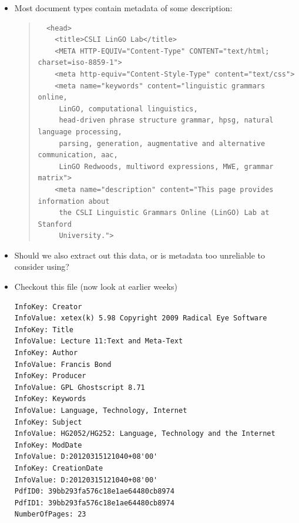 \documentclass[a4paper,landscape,headrule,footrule,xetex]{foils}
\begin{document}
\MyLogo{}
\begin{itemize}
\item Most document types contain metadata of some description:
  \begin{quote}
    \smaller[2]
\begin{verbatim}
  <head>
    <title>CSLI LinGO Lab</title>
    <META HTTP-EQUIV="Content-Type" CONTENT="text/html; charset=iso-8859-1">
    <meta http-equiv="Content-Style-Type" content="text/css">
    <meta name="keywords" content="linguistic grammars online, 
     LinGO, computational linguistics,
     head-driven phrase structure grammar, hpsg, natural language processing,
     parsing, generation, augmentative and alternative communication, aac,
     LinGO Redwoods, multiword expressions, MWE, grammar matrix">
    <meta name="description" content="This page provides information about
     the CSLI Linguistic Grammars Online (LinGO) Lab at Stanford
     University.">
\end{verbatim}
  \end{quote}
\item Should we also extract out this data, or is metadata too
  unreliable to consider using?
\end{itemize}


\begin{itemize}
\item Checkout this file (now look at earlier weeks)
  \begin{small}
\begin{verbatim}
InfoKey: Creator
InfoValue: xetex(k) 5.98 Copyright 2009 Radical Eye Software
InfoKey: Title
InfoValue: Lecture 11:Text and Meta-Text
InfoKey: Author
InfoValue: Francis Bond
InfoKey: Producer
InfoValue: GPL Ghostscript 8.71
InfoKey: Keywords
InfoValue: Language, Technology, Internet
InfoKey: Subject
InfoValue: HG2052/HG252: Language, Technology and the Internet
InfoKey: ModDate
InfoValue: D:20120315121040+08'00'
InfoKey: CreationDate
InfoValue: D:20120315121040+08'00'
PdfID0: 39bb293fa576c18e1ae64480cb8974
PdfID1: 39bb293fa576c18e1ae64480cb8974
NumberOfPages: 23
\end{verbatim}
  \end{small}
\end{itemize}
\end{document}
